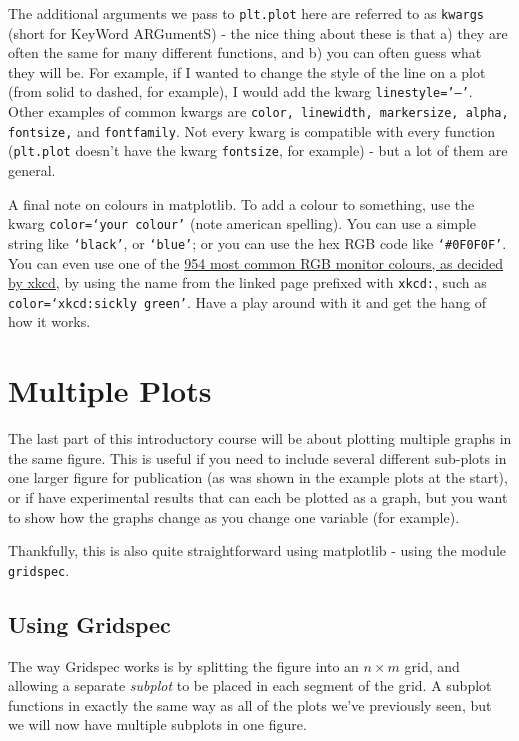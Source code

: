 \documentclass[10pt,a4paper]{memoir}
\begin{document}
The additional arguments we pass to \texttt{plt.plot} here are referred to as \texttt{kwargs} (short for KeyWord ARGumentS) - the nice thing about these is that a) they are often the same for many different functions, and b) you can often guess what they will be. For example, if I wanted to change the style of the line on a plot (from solid to dashed, for example), I would add the kwarg \texttt{linestyle='--'}. Other examples of common kwargs are \texttt{color, linewidth, markersize, alpha, fontsize,} and \texttt{fontfamily}. Not every kwarg is compatible with every function (\texttt{plt.plot} doesn't have the kwarg \texttt{fontsize}, for example) - but a lot of them are general.

A final note on colours in matplotlib. To add a colour to something, use the kwarg \texttt{color=`your colour'} (note american spelling). You can use a simple string like \texttt{`black'}, or \texttt{`blue'}; or you can use the hex RGB code like \texttt{`\#0F0F0F'}. You can even use one of the \href{https://xkcd.com/color/rgb/}{954 most common RGB monitor colours, as decided by xkcd}, by using the name from the linked page prefixed with \texttt{xkcd:}, such as \texttt{color=`xkcd:sickly green'}. Have a play around with it and get the hang of how it works. 
\newpage

\newpage
\section{Multiple Plots}
The last part of this introductory course will be about plotting multiple graphs in the same figure. This is useful if you need to include several different sub-plots in one larger figure for publication (as was shown in the example plots at the start), or if have experimental results that can each be plotted as a graph, but you want to show how the graphs change as you change one variable (for example). 

Thankfully, this is also quite straightforward using matplotlib - using the module \texttt{gridspec}.

\subsection{Using Gridspec}
The way Gridspec works is by splitting the figure into an $n\times m$ grid, and allowing a separate \textit{subplot} to be placed in each segment of the grid. A subplot functions in exactly the same way as all of the plots we've previously seen, but we will now have multiple subplots in one figure. 
\end{document}
